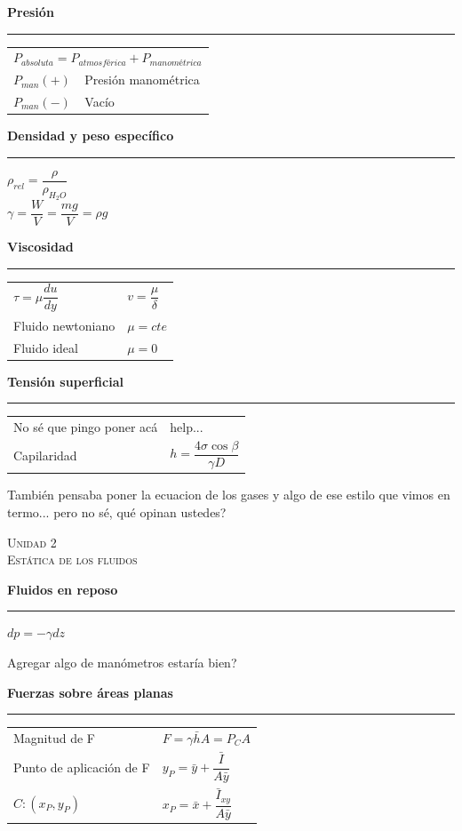 \documentclass[11pt,a4paper]{article}
\newcommand{\unidad}[2]{\begin{center}
		\fontsize{10}{10}\selectfont\color{gray!50!black}\scshape Unidad #1 \\
		\fontsize{14}{14}\selectfont \scshape #2
	\end{center} \vspace{-.6cm}}
\newcommand{\subtitulo}[1]{
	\textbf{#1} \\ \vspace{.1cm} {\color{gray} \hrule} \vspace{.2cm}
}
\begin{document}
		\begin{cajita}
			\centering
			\begin{multicols}{2}
				\subtitulo{Presión \vspace{.085cm}}
				\begin{tabular}{l l}
					\multicolumn{2}{c}{$P_{absoluta} = P_{atmosférica} + P_{manométrica}$\vspace{.1cm}}\\
					$P_{man} (+)$ & Presión manométrica\vspace{.1cm} \\
					$P_{man} (-)$ & Vacío \\
				\end{tabular}
				\columnbreak
				
				\subtitulo{Densidad y peso específico}
				$\rho_{rel} = \dfrac{\rho}{\rho_{H_2O}}$\vspace{.1cm}\\
				$\gamma = \dfrac{W}{V} = \dfrac{mg}{V} = \rho g$\\
			\end{multicols}
			
			\begin{multicols}{2}
				\subtitulo{Viscosidad\vspace{.08cm}}
				\begin{tabular}{l l}
					$\tau = \mu \dfrac{du}{dy}$ & $v = \dfrac{\mu}{\delta}$\\
					Fluido newtoniano & $\mu = cte$ \\
					Fluido ideal & $\mu = 0$
				\end{tabular}
			
			\columnbreak
			
				\subtitulo{Tensión superficial}
				\begin{tabular}{l l}
					No sé que pingo poner acá & help...\\
					Capilaridad & $h = \dfrac{4 \sigma \cos \beta}{\gamma D}$
				\end{tabular}
			\end{multicols}
		
		También pensaba poner la ecuacion de los gases y algo de ese estilo que vimos en termo... pero no sé, qué opinan ustedes?
			
		\end{cajita}
	
	\unidad{2}{Estática de los fluidos}
		\begin{cajita}
			\centering
			\subtitulo{Fluidos en reposo}
			$dp = -\gamma dz$
			
			Agregar algo de manómetros estaría bien?
			
			\subtitulo{Fuerzas sobre áreas planas}
			
			\begin{tabular}{l l}
				Magnitud de F & $F = \gamma \bar{h} A = P_C A$\\
				Punto de aplicación de F & $ y_P = \bar{y} + \dfrac{\bar{I}}{A \bar{y}}$\\
				$C:(x_P, y_P)$& $x_P = \bar{x} + \dfrac{\bar{I}_{xy}}{A \bar{y}}$\\
			\end{tabular}
		\end{cajita}
\end{document}
